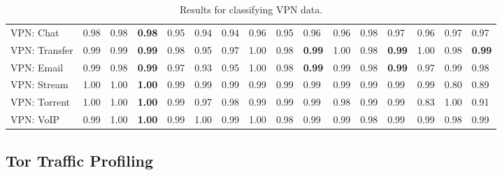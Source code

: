 \begin{table} [ht!]
{\begin{tabular} {|p{2cm}|p{0.7cm}p{0.7cm}p{0.7cm}|p{0.7cm}p{0.7cm}p{0.7cm}|p{0.7cm}p{0.7cm}p{0.7cm}|p{0.7cm}p{0.7cm}p{0.7cm}|p{0.7cm}p{0.7cm}p{0.7cm}|}
VPN: Chat & 0.98 & 0.98 & \textbf{0.98} & 0.95 & 0.94 & 0.94 & 0.96 & 0.95 & 0.96 & 0.96 & 0.98 & 0.97 & 0.96 & 0.97 & 0.97 \\
VPN: Transfer & 0.99 & 0.99 & \textbf{0.99} & 0.98 & 0.95 & 0.97 & 1.00 & 0.98 & \textbf{0.99} & 1.00 & 0.98 & \textbf{0.99} & 1.00 & 0.98 & \textbf{0.99} \\
VPN: Email & 0.99 & 0.98 & \textbf{0.99} & 0.97 & 0.93 & 0.95 & 1.00 & 0.98 & \textbf{0.99} & 0.99 & 0.98 & \textbf{0.99} & 0.97 & 0.99 & 0.98 \\
VPN: Stream & 1.00 & 1.00 & \textbf{1.00} & 0.99 & 0.99 & 0.99 & 0.99 & 0.99 & 0.99 & 0.99 & 0.99 & 0.99 & 0.99 & 0.80 & 0.89 \\
VPN: Torrent & 1.00 & 1.00 & \textbf{1.00} & 0.99 & 0.97 & 0.98 & 0.99 & 0.99 & 0.99 & 0.98 & 0.99 & 0.99 & 0.83 & 1.00 & 0.91 \\
VPN: VoIP & 0.99 & 1.00 & \textbf{1.00} & 0.99 & 1.00 & 0.99 & 1.00 & 0.98 & 0.99 & 0.99 & 0.98 & 0.99 & 0.99 & 0.98 & 0.99 \\
\hline
\end{tabular}}
\label{tab:vpnresults}
\caption{Results for classifying VPN data.}
\end{table}

\subsection{Tor Traffic Profiling}

